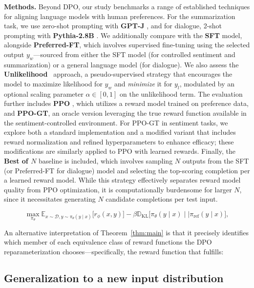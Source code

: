 \textbf{Methods.} Beyond DPO, our study benchmarks a range of established techniques for aligning language models with human preferences. For the summarization task, we use zero-shot prompting with \textbf{GPT-J} \citep{gpt-j}, and for dialogue, 2-shot prompting with \textbf{Pythia-2.8B} \citep{biderman2023pythia}. We additionally compare with the \textbf{SFT} model, alongside \textbf{Preferred-FT}, which involves supervised fine-tuning using the selected output $y_w$—sourced from either the SFT model (for controlled sentiment and summarization) or a general language model (for dialogue). We also assess the \textbf{Unlikelihood}~\citep{welleck2019neural} approach, a pseudo-supervised strategy that encourages the model to maximize likelihood for $y_w$ and \textit{minimize} it for $y_l$, modulated by an optional scaling parameter $\alpha\in[0,1]$ on the unlikelihood term. The evaluation further includes \textbf{PPO} \citep{schulman2017proximal}, which utilizes a reward model trained on preference data, and \textbf{PPO-GT}, an oracle version leveraging the true reward function available in the sentiment-controlled environment. For PPO-GT in sentiment tasks, we explore both a standard implementation \cite{leandro_von_werra_2023_7790115} and a modified variant that includes reward normalization and refined hyperparameters to enhance efficacy; these modifications are similarly applied to PPO with learned rewards. Finally, the \textbf{Best of $N$} baseline is included, which involves sampling $N$ outputs from the SFT (or Preferred-FT for dialogue) model and selecting the top-scoring completion per a learned reward model. While this strategy effectively separates reward model quality from PPO optimization, it is computationally burdensome for larger $N$, since it necessitates generating $N$ candidate completions per test input.

\begin{equation}\label{eq:RL}
\max_{\pi_{\theta}}  \mathbb{E}_{x\sim \mathcal{D}, y\sim \pi_{\theta}(y \mid x)}\bigl[r_{\phi}(x, y)\bigr] - \beta\mathbb{D}_{\textrm{KL}}\bigl[\pi_{\theta}(y\mid x)\mid \mid \pi_\text{ref}(y\mid x)\bigr],
\end{equation}

An alternative interpretation of Theorem~\ref{thm:main} is that it precisely identifies which member of each equivalence class of reward functions the DPO reparameterization chooses—specifically, the reward function that fulfills:

\subsection{Generalization to a new input distribution}

